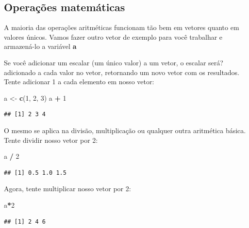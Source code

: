 \documentclass[]{book}
\newenvironment{Shaded}{\begin{snugshade}}{\end{snugshade}}
\newcommand{\DecValTok}[1]{\textcolor[rgb]{0.00,0.00,0.81}{#1}}
\newcommand{\KeywordTok}[1]{\textcolor[rgb]{0.13,0.29,0.53}{\textbf{#1}}}
\newcommand{\NormalTok}[1]{#1}
\newcommand{\OperatorTok}[1]{\textcolor[rgb]{0.81,0.36,0.00}{\textbf{#1}}}
\newcommand{\StringTok}[1]{\textcolor[rgb]{0.31,0.60,0.02}{#1}}
\begin{document}
\hypertarget{operacoes-matematicas}{%
\subsection{Operações matemáticas}\label{operacoes-matematicas}}

A maioria das operações aritméticas funcionam tão bem em vetores quanto em valores únicos. Vamos fazer outro vetor de exemplo para você trabalhar e armazená-lo a variável \textbf{a}

Se você adicionar um escalar (um único valor) a um vetor, o escalar será? adicionado a cada valor no vetor, retornando um novo vetor com os resultados. Tente adicionar 1 a cada elemento em nosso vetor:

\begin{Shaded}
\begin{Highlighting}[]
\NormalTok{a <-}\StringTok{ }\KeywordTok{c}\NormalTok{(}\DecValTok{1}\NormalTok{, }\DecValTok{2}\NormalTok{, }\DecValTok{3}\NormalTok{)}
\NormalTok{a }\OperatorTok{+}\StringTok{ }\DecValTok{1}
\end{Highlighting}
\end{Shaded}

\begin{verbatim}
## [1] 2 3 4
\end{verbatim}

O mesmo se aplica na divisão, multiplicação ou qualquer outra aritmética básica. Tente dividir nosso vetor por 2:

\begin{Shaded}
\begin{Highlighting}[]
\NormalTok{a }\OperatorTok{/}\StringTok{ }\DecValTok{2}
\end{Highlighting}
\end{Shaded}

\begin{verbatim}
## [1] 0.5 1.0 1.5
\end{verbatim}

Agora, tente multiplicar nosso vetor por 2:

\begin{Shaded}
\begin{Highlighting}[]
\NormalTok{a}\OperatorTok{*}\DecValTok{2}
\end{Highlighting}
\end{Shaded}

\begin{verbatim}
## [1] 2 4 6
\end{verbatim}
\end{document}
